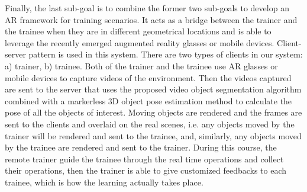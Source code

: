 Finally, the last sub-goal is to combine the former two sub-goals to develop an AR framework for training scenarios.
It acts as a bridge between the trainer and the trainee when they are in different geometrical locations and is able to leverage the recently emerged augmented reality glasses or mobile devices.
Client-server pattern is used in this system. There are two types of clients in our system: a) trainer, b) trainee.
Both of the trainer and the trainee use AR glasses or mobile devices to capture videos of the environment.
Then the videos captured are sent to the server that uses the proposed video object segmentation algorithm combined with a markerless 3D object pose estimation method to calculate the pose of all the objects of interest.
Moving objects are rendered and the frames are sent to the clients and overlaid on the real scenes, i.e. any objects moved by the trainer will be rendered and sent to the trainee, and, similarly, any objects moved by the trainee are rendered and sent to the trainer.
During this course, the remote trainer guide the trainee through the real time operations and collect their operations, then the trainer is able to give customized feedbacks to each trainee, which is how the learning actually takes place.

\cleardoublepage
